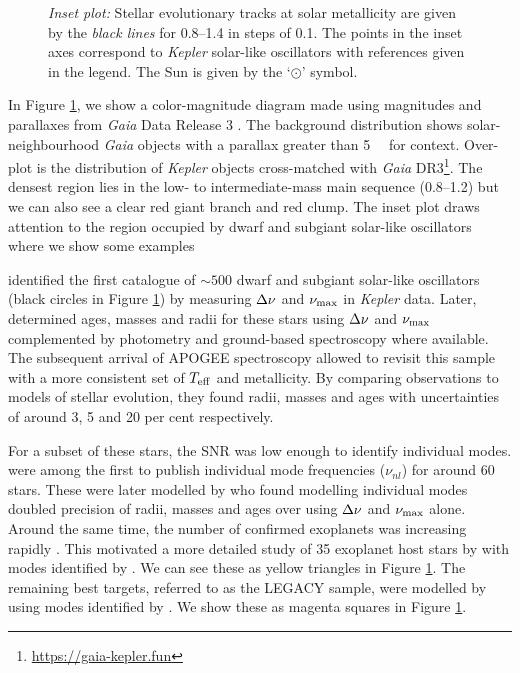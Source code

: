 \begin{figure}
{    \emph{Inset plot:} Stellar evolutionary tracks at solar metallicity are given by the \emph{black lines} for \SIrange{0.8}{1.4}{\solarmass} in steps of \SI{0.1}{\solarmass}. The points in the inset axes correspond to \emph{Kepler} solar-like oscillators with references given in the legend. The Sun is given by the `\(\odot\)' symbol.}
    \label{fig:hr-diagram}
\end{figure}

In Figure \ref{fig:hr-diagram}, we show a color-magnitude diagram made using magnitudes and parallaxes from \emph{Gaia} Data Release 3 \citep[DR3;][]{GaiaCollaboration.Vallenari.ea2022}. The background distribution shows solar-neighbourhood \emph{Gaia} objects with a parallax greater than \SI{5}{\milli\aarcsec} for context. Over-plot is the distribution of \emph{Kepler} objects cross-matched with \emph{Gaia} DR3\footnote{\url{https://gaia-kepler.fun}}. The densest region lies in the low- to intermediate-mass main sequence (\SIrange{0.8}{1.2}{\solarmass}) but we can also see a clear red giant branch and red clump. The inset plot draws attention to the region occupied by dwarf and subgiant solar-like oscillators where we show some examples

\citet{Chaplin.Kjeldsen.ea2011} identified the first catalogue of \(\sim 500\) dwarf and subgiant solar-like oscillators (black circles in Figure \ref{fig:hr-diagram}) by measuring \({\Delta\nu}\) and \({\nu_\mathrm{max}}\) in \emph{Kepler} data. Later, \citet{Chaplin.Basu.ea2014} determined ages, masses and radii for these stars using \({\Delta\nu}\) and \({\nu_\mathrm{max}}\) complemented by photometry and ground-based spectroscopy where available. The subsequent arrival of APOGEE spectroscopy allowed \citet{Serenelli.Johnson.ea2017} to revisit this sample with a more consistent set of \({T_\mathrm{eff}}\) and metallicity. By comparing observations to models of stellar evolution, they found radii, masses and ages with uncertainties of around 3, 5 and 20 per cent respectively.

For a subset of these stars, the SNR was low enough to identify individual modes. \citet{Appourchaux.Chaplin.ea2012} were among the first to publish individual mode frequencies (\(\nu_{nl}\)) for around 60 stars. These were later modelled by \citet{Metcalfe.Creevey.ea2014} who found modelling individual modes doubled precision of radii, masses and ages over using \({\Delta\nu}\) and \({\nu_\mathrm{max}}\) alone. Around the same time, the number of confirmed exoplanets was increasing rapidly \needcite. This motivated a more detailed study of 35 exoplanet host stars by \citet{SilvaAguirre.Davies.ea2015} with modes identified by \citet{Davies.Aguirre.ea2016}. We can see these as yellow triangles in Figure \ref{fig:hr-diagram}. The remaining best targets, referred to as the LEGACY sample, were modelled by \citet{SilvaAguirre.Lund.ea2017} using modes identified by \citet{Lund.SilvaAguirre.ea2017}. We show these as magenta squares in Figure \ref{fig:hr-diagram}.

